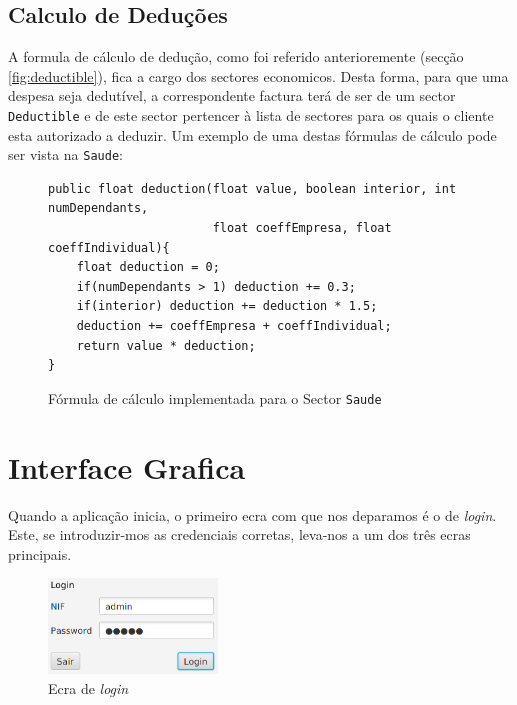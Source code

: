 \documentclass[12pt,a4paper]{report}
\begin{document}
\section{Calculo de Deduções}
    A formula de cálculo de dedução, como foi referido anterioremente (secção
    \ref{fig:deductible}), fica a cargo dos sectores economicos. Desta forma,
    para que uma despesa seja dedutível, a correspondente factura terá de ser de um
    sector \texttt{Deductible}
    e de este sector pertencer à lista de sectores para os quais o cliente esta
    autorizado a deduzir. Um exemplo de uma destas fórmulas de cálculo pode
    ser vista na \texttt{Saude}:
    \begin{figure}[h]
        \begin{verbatim}
public float deduction(float value, boolean interior, int numDependants,
                       float coeffEmpresa, float coeffIndividual){
    float deduction = 0;
    if(numDependants > 1) deduction += 0.3;
    if(interior) deduction += deduction * 1.5;
    deduction += coeffEmpresa + coeffIndividual;
    return value * deduction;
}
        \end{verbatim}
        \caption{Fórmula de cálculo implementada para o Sector
                    \texttt{Saude}}
        \label{fig:formulaDeduct}
    \end{figure}

\chapter{Interface Grafica}

    Quando a aplicação inicia, o primeiro ecra com que nos deparamos é o de
    \textit{login}. Este, se introduzir-mos as credenciais corretas, leva-nos a um
    dos três ecras principais.
\begin{figure}[h]
    \centering
    \includegraphics[width=0.4\textwidth]{./images/login.png}
    \caption{Ecra de \textit{login}}
    \label{fig:login}
\end{figure}
\end{document}
